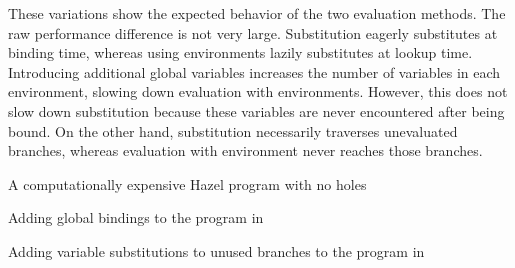 These variations show the expected behavior of the two evaluation methods. The raw performance difference is not very large. Substitution eagerly substitutes at binding time, whereas using environments lazily substitutes at lookup time. Introducing additional global variables increases the number of variables in each environment, slowing down evaluation with environments. However, this does not slow down substitution because these variables are never encountered after being bound. On the other hand, substitution necessarily traverses unevaluated branches, whereas evaluation with environment never reaches those branches.

\begin{listing}
  \caption{A computationally expensive Hazel program with no holes}
  \label{fig:perf-fib}
\end{listing}

\begin{listing}
  \caption{Adding global bindings to the program in }
  \label{fig:perf-fib-more-bindings}
\end{listing}

\begin{listing}
  \caption{Adding variable substitutions to unused branches to the program in }
  \label{fig:perf-fib-more-branches}
\end{listing}

